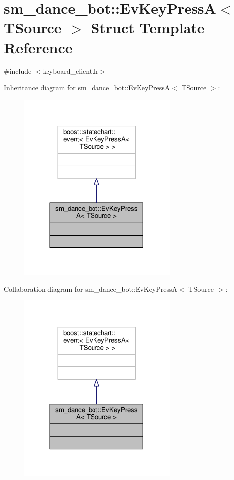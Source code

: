 \hypertarget{structsm__dance__bot_1_1EvKeyPressA}{}\section{sm\+\_\+dance\+\_\+bot\+:\+:Ev\+Key\+PressA$<$ T\+Source $>$ Struct Template Reference}
\label{structsm__dance__bot_1_1EvKeyPressA}


{\ttfamily \#include $<$keyboard\+\_\+client.\+h$>$}



Inheritance diagram for sm\+\_\+dance\+\_\+bot\+:\+:Ev\+Key\+PressA$<$ T\+Source $>$\+:
\nopagebreak
\begin{figure}[H]
\begin{center}
\leavevmode
\includegraphics[width=221pt]{structsm__dance__bot_1_1EvKeyPressA__inherit__graph}
\end{center}
\end{figure}


Collaboration diagram for sm\+\_\+dance\+\_\+bot\+:\+:Ev\+Key\+PressA$<$ T\+Source $>$\+:
\nopagebreak
\begin{figure}[H]
\begin{center}
\leavevmode
\includegraphics[width=221pt]{structsm__dance__bot_1_1EvKeyPressA__coll__graph}
\end{center}
\end{figure}



